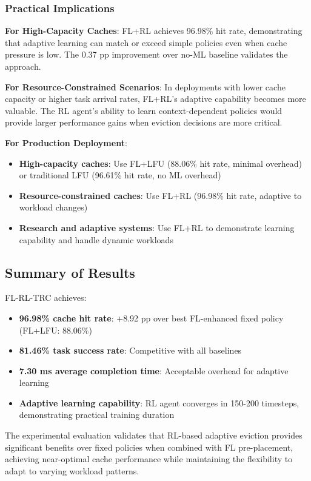 \subsubsection{Practical Implications}

\textbf{For High-Capacity Caches}: FL+RL achieves 96.98\% hit rate, demonstrating that adaptive learning can match or exceed simple policies even when cache pressure is low. The 0.37 pp improvement over no-ML baseline validates the approach.

\textbf{For Resource-Constrained Scenarios}: In deployments with lower cache capacity or higher task arrival rates, FL+RL's adaptive capability becomes more valuable. The RL agent's ability to learn context-dependent policies would provide larger performance gains when eviction decisions are more critical.

\textbf{For Production Deployment}: 
\begin{itemize}
    \item \textbf{High-capacity caches}: Use FL+LFU (88.06\% hit rate, minimal overhead) or traditional LFU (96.61\% hit rate, no ML overhead)
    \item \textbf{Resource-constrained caches}: Use FL+RL (96.98\% hit rate, adaptive to workload changes)
    \item \textbf{Research and adaptive systems}: Use FL+RL to demonstrate learning capability and handle dynamic workloads
\end{itemize}

\subsection{Summary of Results}

FL-RL-TRC achieves:
\begin{itemize}
    \item \textbf{96.98\% cache hit rate}: +8.92 pp over best FL-enhanced fixed policy (FL+LFU: 88.06\%)
    \item \textbf{81.46\% task success rate}: Competitive with all baselines
    \item \textbf{7.30 ms average completion time}: Acceptable overhead for adaptive learning
    \item \textbf{Adaptive learning capability}: RL agent converges in 150-200 timesteps, demonstrating practical training duration
\end{itemize}

The experimental evaluation validates that RL-based adaptive eviction provides significant benefits over fixed policies when combined with FL pre-placement, achieving near-optimal cache performance while maintaining the flexibility to adapt to varying workload patterns.
